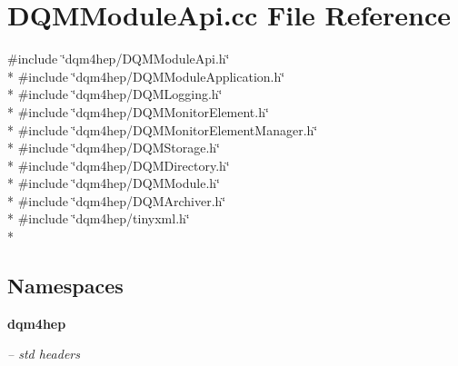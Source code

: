 \section{D\+Q\+M\+Module\+Api.\+cc File Reference}
\label{DQMModuleApi_8cc}
{\ttfamily \#include \char`\"{}dqm4hep/\+D\+Q\+M\+Module\+Api.\+h\char`\"{}}\\*
{\ttfamily \#include \char`\"{}dqm4hep/\+D\+Q\+M\+Module\+Application.\+h\char`\"{}}\\*
{\ttfamily \#include \char`\"{}dqm4hep/\+D\+Q\+M\+Logging.\+h\char`\"{}}\\*
{\ttfamily \#include \char`\"{}dqm4hep/\+D\+Q\+M\+Monitor\+Element.\+h\char`\"{}}\\*
{\ttfamily \#include \char`\"{}dqm4hep/\+D\+Q\+M\+Monitor\+Element\+Manager.\+h\char`\"{}}\\*
{\ttfamily \#include \char`\"{}dqm4hep/\+D\+Q\+M\+Storage.\+h\char`\"{}}\\*
{\ttfamily \#include \char`\"{}dqm4hep/\+D\+Q\+M\+Directory.\+h\char`\"{}}\\*
{\ttfamily \#include \char`\"{}dqm4hep/\+D\+Q\+M\+Module.\+h\char`\"{}}\\*
{\ttfamily \#include \char`\"{}dqm4hep/\+D\+Q\+M\+Archiver.\+h\char`\"{}}\\*
{\ttfamily \#include \char`\"{}dqm4hep/tinyxml.\+h\char`\"{}}\\*
\subsection*{Namespaces}
\begin{DoxyCompactItemize}
\item 
 {\bf dqm4hep}
\begin{DoxyCompactList}\small\item\em -- std headers \end{DoxyCompactList}\end{DoxyCompactItemize}
